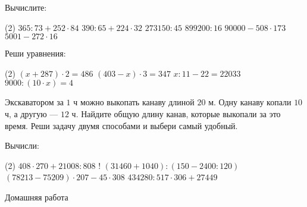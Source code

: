 \begin{class}[number=2]
\begin{listofex}
		\item Вычислите:
			\begin{tasks}(2)
			\task  \( 365:73+252\cdot84 \)
			\task \( 390:65+224\cdot32 \)
			\task \( 273150:45 \)
			\task \( 899200:16 \)
			\task \( 90000-508\cdot173 \)
			\task \( 5001-272\cdot16 \)
			\end{tasks}
		\item Реши уравнения:
		\begin{tasks}(2)
			\task \( (x+287)\cdot2=486 \)
			\task \( (403-x)\cdot3=347 \)
			\task \( x:11-22=22033 \)
			\task \( 9000:(10\cdot x)=4 \)
		\end{tasks}
		\item Экскаватором за \( 1 \) ч можно выкопать канаву длиной \( 20 \) м. Одну канаву копали \( 10 \) ч, а другую --- \( 12 \) ч. Найдите общую длину канав, которые выкопали за это время. Реши задачу двумя способами и выбери самый удобный.
		\item Вычисли:
		\begin{tasks}(2)
			\task \( 408\cdot270+21008:808 \)
			\task! \( (31460+1040):(150-2400:120) \)
			\task \( (78213-75209)\cdot207-45\cdot308 \)
			\task \( 434280:517\cdot306+27449 \)
		\end{tasks}
	\end{listofex}
\end{class}

\begin{homework}[number=2]
	\begin{listofex}
		\item Домашняя работа
	\end{listofex}
\end{homework}


